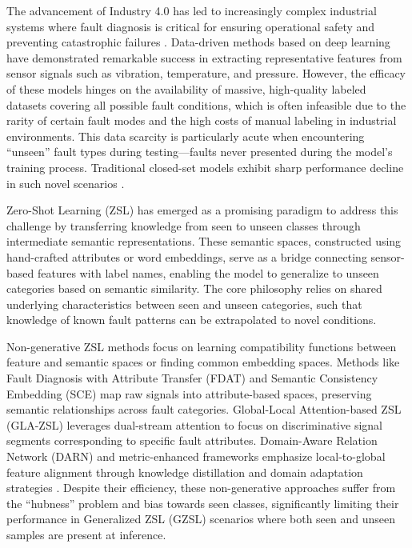 \documentclass[journal]{IEEEtran}
\begin{document}
The advancement of Industry 4.0 has led to increasingly complex industrial systems where fault diagnosis is critical for ensuring operational safety and preventing catastrophic failures \cite{Lei2020, Zhao2019, Jiao2022}. Data-driven methods based on deep learning have demonstrated remarkable success in extracting representative features from sensor signals such as vibration, temperature, and pressure. However, the efficacy of these models hinges on the availability of massive, high-quality labeled datasets covering all possible fault conditions, which is often infeasible due to the rarity of certain fault modes and the high costs of manual labeling in industrial environments. This data scarcity is particularly acute when encountering ``unseen'' fault types during testing---faults never presented during the model's training process. Traditional closed-set models exhibit sharp performance decline in such novel scenarios \cite{Gao2020, Xu2021, Lampert2014, Xian2018}.

Zero-Shot Learning (ZSL) has emerged as a promising paradigm to address this challenge by transferring knowledge from seen to unseen classes through intermediate semantic representations. These semantic spaces, constructed using hand-crafted attributes or word embeddings, serve as a bridge connecting sensor-based features with label names, enabling the model to generalize to unseen categories based on semantic similarity. The core philosophy relies on shared underlying characteristics between seen and unseen categories, such that knowledge of known fault patterns can be extrapolated to novel conditions.

Non-generative ZSL methods focus on learning compatibility functions between feature and semantic spaces or finding common embedding spaces. Methods like Fault Diagnosis with Attribute Transfer (FDAT) and Semantic Consistency Embedding (SCE) map raw signals into attribute-based spaces, preserving semantic relationships across fault categories. Global-Local Attention-based ZSL (GLA-ZSL) leverages dual-stream attention to focus on discriminative signal segments corresponding to specific fault attributes. Domain-Aware Relation Network (DARN) and metric-enhanced frameworks emphasize local-to-global feature alignment through knowledge distillation and domain adaptation strategies \cite{Chen2023DARN, Fan2024metric, Zhang2023effective, Liu2025KD, Song2025physical, Xie2025domain}. Despite their efficiency, these non-generative approaches suffer from the ``hubness'' problem and bias towards seen classes, significantly limiting their performance in Generalized ZSL (GZSL) scenarios where both seen and unseen samples are present at inference.
\end{document}
